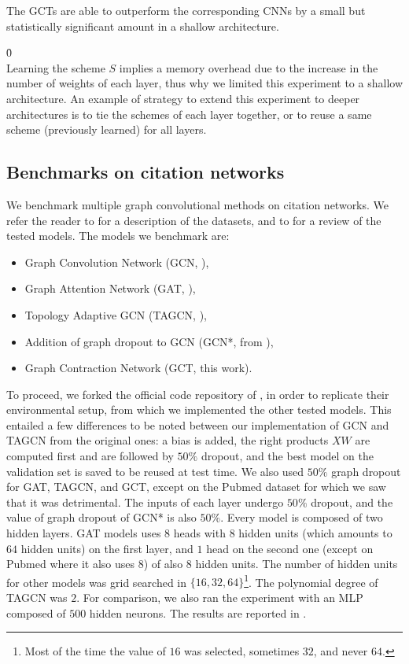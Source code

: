 The GCTs are able to outperform the corresponding CNNs by a small but statistically significant amount in a shallow architecture.

\h{0}\\

Learning the scheme $S$ implies a memory overhead due to the increase in the number of weights of each layer, thus why we limited this experiment to a shallow architecture. An example of strategy to extend this experiment to deeper architectures is to tie the schemes of each layer together, or to reuse a same scheme (previously learned) for all layers.


\subsection{Benchmarks on citation networks}
\label{sec:lss}

We benchmark multiple graph convolutional methods on citation networks. We refer the reader to  for a description of the datasets, and to  for a review of the tested models. The models we benchmark are:
\begin{itemize}[nolistsep,noitemsep]
 \item Graph Convolution Network (GCN, \cite{kipf2016semi}),
 \item Graph Attention Network (GAT, \cite{velickovic2017graph}),
 \item Topology Adaptive GCN (TAGCN,  \cite{du2017topology}),
 \item Addition of graph dropout to GCN (GCN*, from ),
 \item Graph Contraction Network (GCT, this work).
\end{itemize}

To proceed, we forked the official code repository of \cite{velickovic2017graph}, in order to replicate their environmental setup, from which we implemented the other tested models. This entailed a few differences %
to be noted between our implementation of GCN and TAGCN from the original ones: a bias is added, the right products $XW$ are computed first and are followed by $50\%$ dropout, and the best model on the validation set is saved to be reused at test time. We also used $50\%$ graph dropout for GAT, TAGCN, and GCT, except on the Pubmed dataset for which we saw that it was detrimental. The inputs of each layer undergo $50\%$ dropout, and the value of graph dropout of GCN* is also $50\%$. Every model is composed of two hidden layers. GAT models uses $8$ heads with $8$ hidden units (which amounts to $64$ hidden units) on the first layer, and $1$ head on the second one (except on Pubmed where it also uses $8$) of also $8$ hidden units. The number of hidden units for other models was grid searched in $\{16, 32, 64\}$\footnote{Most of the time the value of $16$ was selected, sometimes $32$, and never $64$.}. The polynomial degree of TAGCN was $2$. For comparison, we also ran the experiment with an MLP composed of $500$ hidden neurons. The results are reported in .

